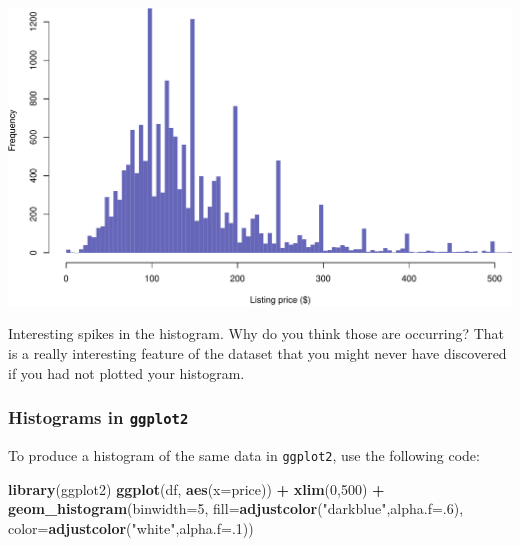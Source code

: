 \documentclass[
]{book}
\newenvironment{Shaded}{\begin{snugshade}}{\end{snugshade}}
\newcommand{\DataTypeTok}[1]{\textcolor[rgb]{0.13,0.29,0.53}{#1}}
\newcommand{\DecValTok}[1]{\textcolor[rgb]{0.00,0.00,0.81}{#1}}
\newcommand{\KeywordTok}[1]{\textcolor[rgb]{0.13,0.29,0.53}{\textbf{#1}}}
\newcommand{\NormalTok}[1]{#1}
\newcommand{\OperatorTok}[1]{\textcolor[rgb]{0.81,0.36,0.00}{\textbf{#1}}}
\newcommand{\StringTok}[1]{\textcolor[rgb]{0.31,0.60,0.02}{#1}}
\begin{document}
\includegraphics{figures/unnamed-chunk-216-1.pdf}

Interesting spikes in the histogram. Why do you think those are occurring? That is a really interesting feature of the dataset that you might never have discovered if you had not plotted your histogram.

\hypertarget{histograms-in-ggplot2}{%
\subsubsection*{\texorpdfstring{Histograms in \texttt{ggplot2}}{Histograms in ggplot2}}\label{histograms-in-ggplot2}}

To produce a histogram of the same data in \texttt{ggplot2}, use the following code:

\begin{Shaded}
\begin{Highlighting}[]
\KeywordTok{library}\NormalTok{(ggplot2)}
\KeywordTok{ggplot}\NormalTok{(df, }\KeywordTok{aes}\NormalTok{(}\DataTypeTok{x=}\NormalTok{price)) }\OperatorTok{+}\StringTok{ }
\StringTok{  }\KeywordTok{xlim}\NormalTok{(}\DecValTok{0}\NormalTok{,}\DecValTok{500}\NormalTok{) }\OperatorTok{+}
\StringTok{  }\KeywordTok{geom_histogram}\NormalTok{(}\DataTypeTok{binwidth=}\DecValTok{5}\NormalTok{,}
                 \DataTypeTok{fill=}\KeywordTok{adjustcolor}\NormalTok{(}\StringTok{"darkblue"}\NormalTok{,}\DataTypeTok{alpha.f=}\NormalTok{.}\DecValTok{6}\NormalTok{),}
                 \DataTypeTok{color=}\KeywordTok{adjustcolor}\NormalTok{(}\StringTok{"white"}\NormalTok{,}\DataTypeTok{alpha.f=}\NormalTok{.}\DecValTok{1}\NormalTok{)) }
\end{Highlighting}
\end{Shaded}
\end{document}
